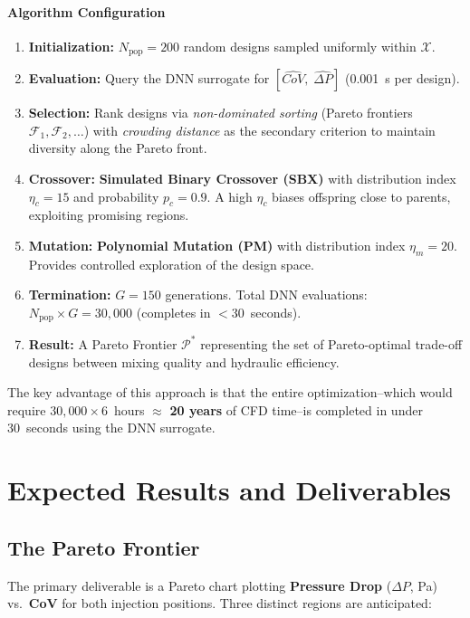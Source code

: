 \documentclass[12pt, a4paper]{report}
\begin{document}
\subsubsection{Algorithm Configuration}
\begin{enumerate}
    \item \textbf{Initialization:} $N_{\text{pop}} = 200$ random designs sampled uniformly within $\mathcal{X}$.
    \item \textbf{Evaluation:} Query the DNN surrogate for $[\widehat{CoV},\; \widehat{\Delta P}]$ (0.001~s per design).
    \item \textbf{Selection:} Rank designs via \textit{non-dominated sorting} (Pareto frontiers $\mathcal{F}_1, \mathcal{F}_2, \ldots$) with \textit{crowding distance} as the secondary criterion to maintain diversity along the Pareto front.
    \item \textbf{Crossover:} \textbf{Simulated Binary Crossover (SBX)} with distribution index $\eta_c = 15$ and probability $p_c = 0.9$. A high $\eta_c$ biases offspring close to parents, exploiting promising regions.
    \item \textbf{Mutation:} \textbf{Polynomial Mutation (PM)} with distribution index $\eta_m = 20$. Provides controlled exploration of the design space.
    \item \textbf{Termination:} $G = 150$ generations. Total DNN evaluations: $N_{\text{pop}} \times G = 30{,}000$ (completes in $<$30~seconds).
    \item \textbf{Result:} A Pareto Frontier $\mathcal{P}^*$ representing the set of Pareto-optimal trade-off designs between mixing quality and hydraulic efficiency.
\end{enumerate}

\noindent The key advantage of this approach is that the entire optimization--which would require $30{,}000 \times 6$~hours $\approx$ \textbf{20 years} of CFD time--is completed in under 30~seconds using the DNN surrogate.

\chapter{Expected Results and Deliverables}

\section{The Pareto Frontier}
The primary deliverable is a Pareto chart plotting \textbf{Pressure Drop} ($\Delta P$, Pa) vs.\ \textbf{CoV} for both injection positions. Three distinct regions are anticipated:
\end{document}
